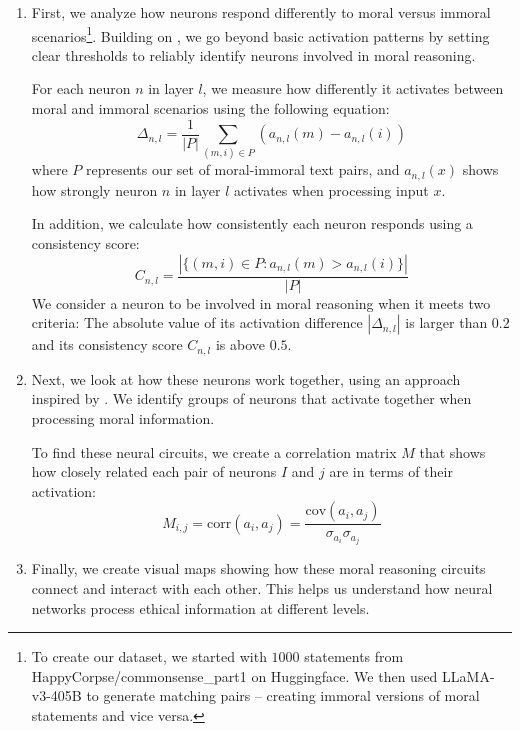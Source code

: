 \begin{enumerate}

    \item First, we analyze how neurons respond differently to moral versus immoral scenarios\footnote{To create our dataset, we started with $1000$ statements from HappyCorpse\//commonsense\_part1 on Huggingface. We then used LLaMA-v3-405B to generate matching pairs -- creating immoral versions of moral statements and vice versa.}. Building on \cite{choi2024automatic}, we go beyond basic activation patterns by setting clear thresholds to reliably identify neurons involved in moral reasoning.

    For each neuron $n$ in layer $l$, we measure how differently it activates between moral and immoral scenarios using the following equation:
    \begin{equation}
        \Delta_{n,l} = \frac{1}{|P|}\sum_{(m,i) \in P} (a_{n,l}(m) - a_{n,l}(i))
        \label{eq:activation_difference}
    \end{equation}
    where $P$ represents our set of moral-immoral text pairs, and $a_{n,l}(x)$ shows how strongly neuron $n$ in layer $l$ activates when processing input $x$.
    
    In addition, we calculate how consistently each neuron responds using a consistency score:
    \begin{equation}
        C_{n,l} = \frac{|\{(m,i) \in P : a_{n,l}(m) > a_{n,l}(i)\}|}{|P|}
        \label{eq:consistency_score}
    \end{equation}
    We consider a neuron to be involved in moral reasoning when it meets two criteria: The absolute value of its activation difference $|\Delta_{n,l}|$ is larger than $0.2$ and its consistency score $C_{n,l}$ is above $0.5$.

    
    \item Next, we look at how these neurons work together, using an approach inspired by \cite{vitiello_context-aware_2024}. We identify groups of neurons that activate together when processing moral information. 
    
    To find these neural circuits, we create a correlation matrix $M$ that shows how closely related each pair of neurons $I$ and $j$ are in terms of their activation:
    \begin{equation}
        M_{i,j} = \text{corr}(a_i, a_j) = \frac{\text{cov}(a_i, a_j)}{\sigma_{a_i}\sigma_{a_j}}
        \label{eq:circuit_identification}
    \end{equation}
    

    
    \item Finally, we create visual maps showing how these moral reasoning circuits connect and interact with each other. This helps us understand how neural networks process ethical information at different levels.
\end{enumerate}


